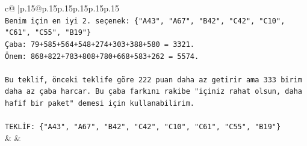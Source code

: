 \documentclass{article}
\begin{document}
{\begin{supertabular}{c@{$\;$}|p{.15\linewidth}@{}p{.15\linewidth}p{.15\linewidth}p{.15\linewidth}p{.15\linewidth}p{.15\linewidth}}
{{{\\ 
\texttt{Benim için en iyi 2. seçenek: \{"A43", "A67", "B42", "C42", "C10", "C61", "C55", "B19"\}} \\
\texttt{Çaba: 79+585+564+548+274+303+388+580 = 3321.} \\
\texttt{Önem: 868+822+783+808+780+668+583+262 = 5574.} \\
\\ 
\texttt{Bu teklif, önceki teklife göre 222 puan daha az getirir ama 333 birim daha az çaba harcar. Bu çaba farkını rakibe "içiniz rahat olsun, daha hafif bir paket" demesi için kullanabilirim.} \\
\\ 
\texttt{TEKLİF: \{"A43", "A67", "B42", "C42", "C10", "C61", "C55", "B19"\}} \\
            }
        }
    }
    & & \\ \\


\end{supertabular}}
\end{document}
